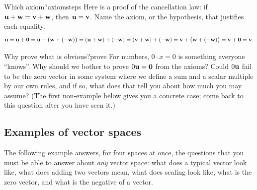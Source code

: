 \documentclass[11pt]{article}
\begin{document}
\begin{kc}{Which axiom?}{axiomsteps}
Here is a proof of the cancellation law: if $\mathbf{u}+\mathbf{w}=\mathbf{v}+\mathbf{w}$, then $\mathbf{u}=\mathbf{v}$. Name the axiom, or the hypothesis, that justifies each equality.
\[
\mathbf{u}=\mathbf{u}+\mathbf{0}=\mathbf{u}+\bigl(\mathbf{w}+(-\mathbf{w})\bigr)=(\mathbf{u}+\mathbf{w})+(-\mathbf{w})=(\mathbf{v}+\mathbf{w})+(-\mathbf{w})=\mathbf{v}+\bigl(\mathbf{w}+(-\mathbf{w})\bigr)=\mathbf{v}+\mathbf{0}=\mathbf{v}.
\]
\end{kc}

\begin{think}{Why prove what is obvious?}{prove}
For numbers, $0\cdot x=0$ is something everyone ``knows''. Why should we bother to prove $0\mathbf{u}=\mathbf{0}$ from the axioms? Could $0\mathbf{u}$ fail to be the zero vector in some system where we define a sum and a scalar multiple by our own rules, and if so, what does that tell you about how much you may assume? (The first non-example below gives you a concrete case; come back to this question after you have seen it.)
\end{think}

\subsection*{Examples of vector spaces}

The following example answers, for four spaces at once, the questions that you must be able to answer about \emph{any} vector space: what does a typical vector look like, what does adding two vectors mean, what does scaling look like, what is the zero vector, and what is the negative of a vector.
\end{document}
